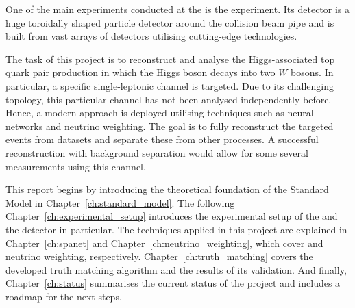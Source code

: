 \documentclass[bachelor,ngerman,english]{GAUBM}
\begin{document}
One of the main experiments conducted at the \lhc is the \atlas experiment. Its detector is a huge toroidally shaped particle detector around the collision beam pipe and is built from vast arrays of detectors utilising cutting-edge technologies.

The task of this project is to reconstruct and analyse the Higgs-associated top quark pair production in which the Higgs boson decays into two $W$ bosons. In particular, a specific single-leptonic channel is targeted. Due to its challenging topology, this particular channel has not been analysed independently before. Hence, a modern approach is deployed utilising techniques such as neural networks and neutrino weighting. The goal is to fully reconstruct the targeted events from \atlas datasets and separate these from other processes. A successful reconstruction with background separation would allow for some several measurements using this channel.

This report begins by introducing the theoretical foundation of the Standard Model in Chapter~\ref{ch:standard_model}. The following Chapter~\ref{ch:experimental_setup} introduces the experimental setup of the \lhc and the \atlas detector in particular. The techniques applied in this project are explained in Chapter~\ref{ch:spanet} and Chapter~\ref{ch:neutrino_weighting}, which cover \spanet and neutrino weighting, respectively. Chapter~\ref{ch:truth_matching} covers the developed truth matching algorithm and the results of its validation. And finally, Chapter~\ref{ch:status} summarises the current status of the project and includes a roadmap for the next steps. 



\end{document}

